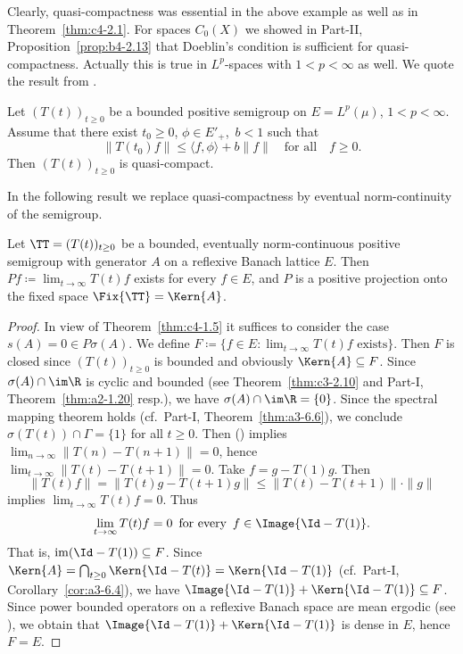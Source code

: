 Clearly, quasi-compactness was essential in the above example as well as in Theorem~\ref{thm:c4-2.1}.
For spaces $C_{0}(X)$ we showed in 
Part-II, Proposition~\ref{prop:b4-2.13} 
that Doeblin's condition is sufficient for quasi-compactness.
Actually this is true in $L^{p}$-spaces with $1 < p < \infty$ as well.
We quote the result from \textcite{lotz:1986}.
\begin{proposition}\label{prop:c4-2.4}
%
%
Let $(T(t))_{t \geq 0}$ be a bounded positive semigroup on $E = L^{p}(\mu)$, $1 < p < \infty$.
Assume that there exist $t_{0} \geq 0$, $\phi \in E'_{+}$,\, $b < 1$ such that
\begin{equation}\label{eq:c4-2.4}
\|T(t_{0})f\| \leq \langle f,\phi \rangle + b\|f\| \quad \text{for all} \quad f \geq 0.
\end{equation}
Then $(T(t))_{t \geq 0}$ is quasi-compact.
\end{proposition}
In the following result we replace quasi-compactness by eventual norm-continuity of the semigroup.
\begin{theorem} \label{thm:c4-2.5}
%
Let $\TT = (T(t))_{t \geq 0}$ be a bounded, eventually norm-continuous positive semigroup with generator $A$ on a reflexive Banach lattice $E$.
Then $Pf \coloneq  \lim_{t \to \infty} T(t)f$ exists for every $f \in E$, and
$P$ is a positive projection onto the fixed space $\Fix{\TT} = \Kern{A}$. 
\end{theorem}
\begin{proof}
In view of Theorem~\ref{thm:c4-1.5} it suffices to consider the case $s(A) = 0 \in P{\sigma}(A)$.
We define $F \coloneq \{f \in E \colon \lim_{t \to \infty} T(t)f \text{ exists}\}$.
Then $F$ is closed since $(T(t))_{t \geq 0}$ is bounded and obviously $\Kern{A} \subseteq F$.
Since $\sigma(A) \cap \im\R$ is cyclic and bounded (see Theorem~\ref{thm:c3-2.10} and Part-I, Theorem~\ref{thm:a2-1.20} resp.), we have $\sigma(A) \cap \im\R = \{0\}$.
Since the spectral mapping theorem holds (cf.\ Part-I, Theorem~\ref{thm:a3-6.6}), we conclude $\sigma(T(t)) \cap \Gamma = \{1\}$ for all $t \geq 0$.
Then () implies $\lim_{n \to \infty} \|T(n) - T(n+1)\| = 0$, hence $\lim_{t \to \infty}\|T(t) - T(t+1)\| = 0$.
Take $f = g - T(1)g$.
Then 
%
\[
	\|T(t)f\| = \|T(t)g - T(t+1)g\| \leq \|T(t) - T(t+1)\| \cdot \|g\|
\]
%
implies $\lim_{t \to \infty} T(t)f = 0$.
Thus
\begin{equation}\label{eq:c4-2.5}
\lim_{t \to \infty} T(t)f = 0\, \text{ for every }\, f \in \Image{\Id - T(1)}.
\end{equation}
That is, $\mathrm{im}(\Id - T(1)) \subseteq F$.
Since $\Kern{A} = \bigcap_{t \geq 0} \Kern{\Id - T(t)} = \Kern{\Id - T(1)}$ (cf.\ Part-I, Corollary~\ref{cor:a3-6.4}), we have $\Image{\Id - T(1)} + \Kern{\Id - T(1)} \subseteq F$.
Since power bounded operators on a reflexive Banach space are mean ergodic (\eg  see \textcite[Chapter~2, Theorem~1.2]{krengel:1985}), we obtain that $\Image{\Id - T(1)} + \Kern{\Id - T(1)}$ is dense in $E$, hence $F = E$.
\end{proof}
